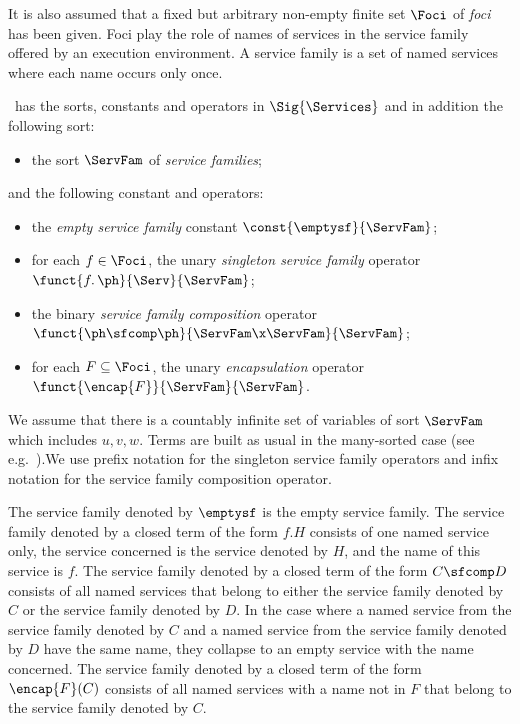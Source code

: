 \documentclass[fleqn]{llncs}
\begin{document}
It is also assumed that a fixed but arbitrary non-empty finite set
$\Foci$ of \emph{foci} has been given.
Foci play the role of names of services in the service family offered by
an execution environment.
A service family is a set of named services where each name occurs only
once.

\SFA\ has the sorts, constants and operators in $\Sig{\Services}$
and in addition the following sort:
\begin{itemize}
\item
the sort $\ServFam$ of \emph{service families};
\end{itemize}
and the following constant and operators:
\begin{itemize}
\item
the \emph{empty service family} constant $\const{\emptysf}{\ServFam}$;
\item
for each $f \in \Foci$, the unary \emph{singleton service family}
operator $\funct{\mathop{f{.}} \ph}{\Serv}{\ServFam}$;
\item
the binary \emph{service family composition} operator
$\funct{\ph \sfcomp \ph}{\ServFam \x \ServFam}{\ServFam}$;
\item
for each $F \subseteq \Foci$, the unary \emph{encapsulation} operator
$\funct{\encap{F}}{\ServFam}{\ServFam}$.
\end{itemize}
We assume that there is a countably infinite set of variables of sort
$\ServFam$ which includes $u,v,w$.
Terms are built as usual in the many-sorted case
(see e.g.~\cite{ST99a,Wir90a}).\linebreak[2]
We use prefix notation for the singleton service family operators and
infix nota\-tion for the service family composition operator.

The service family denoted by $\emptysf$ is the empty service family.
The service family denoted by a closed term of the form $f.H$ consists
of one named service only, the service concerned is the service denoted
by $H$, and the name of this service is $f$.
The service family denoted by a closed term of the form $C \sfcomp D$
consists of all named services that belong to either the service family
denoted by $C$ or the service family denoted by $D$.
In the case where a named service from the service family denoted by $C$
and a named service from the service family denoted by $D$ have the same
name, they collapse to an empty service with the name concerned.
The service family denoted by a closed term of the form $\encap{F}(C)$
consists of all named services with a name not in $F$ that belong to the
service family denoted by $C$.
\end{document}
